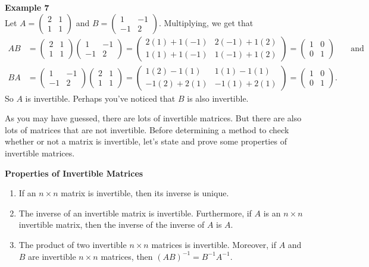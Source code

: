 \documentclass[12pt]{article}
\def\it{\item}
\def\be{\begin{enumerate}} \def\ee{\end{enumerate}}
\def\lp{\left(} \def\rp{\right)} \def\abs#1{\vert #1 \vert}
\def\Idd{\begin{pmatrix} 1 & 0 \\ 0 & 1 \end{pmatrix}}
\begin{document}
{\bf Example 7} \\
Let $A = \begin{pmatrix} 2 & 1 \\ 1 & 1 \end{pmatrix}$ and 
$B = \lp \begin{array}{rr} 1 & -1 \\ -1 & 2 \end{array} \rp$. 
Multiplying, we get that
\begin{align*}
AB &= \begin{pmatrix} 2 & 1 \\ 1 & 1 \end{pmatrix} \lp \begin{array}{rr} 1 & -1 \\ -1 & 2 \end{array} \rp = 
\begin{pmatrix} 2(1)+1(-1) & 2(-1)+1(2) \\ 1(1)+ 1(-1) & 1(-1)+1(2) \end{pmatrix} = \Idd && \text{and} \\[.05in]
BA &=  \lp \begin{array}{rr} 1 & -1 \\ -1 & 2 \end{array} \rp \begin{pmatrix} 2 & 1 \\ 1 & 1 \end{pmatrix} = \begin{pmatrix} 1(2)-1(1) & 1(1)-1(1) \\
-1(2)+2(1) & -1(1)+2(1) \end{pmatrix} = \Idd.
\end{align*}
So $A$ is invertible. Perhaps you've noticed that $B$ is also invertible.

As you may have guessed, there are lots of invertible matrices. But there are also lots of matrices that are not invertible. Before determining a method to check whether or not a matrix is invertible, let's state and prove some properties of invertible matrices.

\begin{framed}
	{\bf Properties of Invertible Matrices}
	\be
	\it If an $n \times n$ matrix is invertible, then its inverse is unique.
	\it The inverse of an invertible matrix is invertible. Furthermore, if $A$
		is an $n \times n$ invertible matrix, then the inverse of the inverse of
		$A$ is $A$.
	\it The product of two invertible $n \times n$ matrices is invertible.
		Moreover, if $A$ and $B$ are invertible $n \times n$ matrices, then
		$(AB)^{-1} = B^{-1} A^{-1}$.
	\ee
\end{framed}
\end{document}

